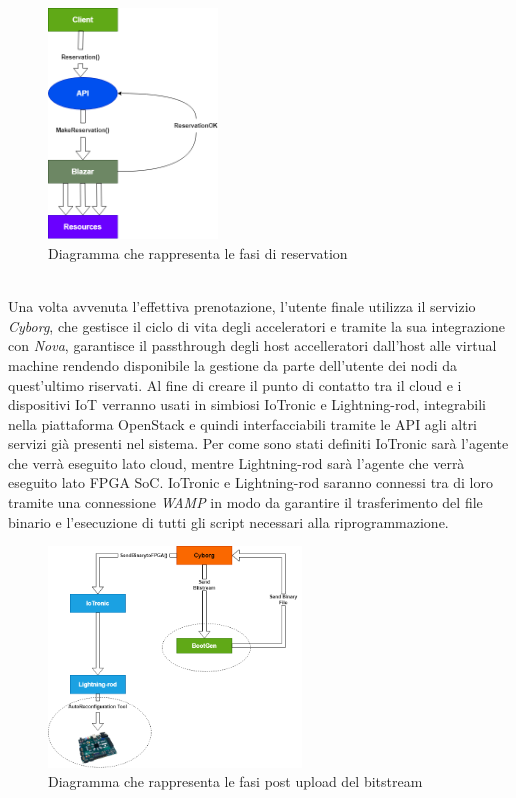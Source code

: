 \begin{figure}[h]
\centering
\includegraphics[width=0.4\textwidth]{images/Arch1.png}
\caption{Diagramma che rappresenta le fasi di reservation}
\end{figure}\\
Una volta avvenuta l'effettiva prenotazione, l'utente finale utilizza il servizio \textit{Cyborg},  che gestisce il ciclo di vita degli acceleratori e tramite la sua integrazione con \textit{Nova}, garantisce il passthrough degli host accelleratori dall'host alle virtual machine rendendo disponibile la gestione da parte dell'utente dei nodi da quest'ultimo riservati. Al fine di creare il punto di contatto tra il cloud e i dispositivi IoT verranno usati in simbiosi IoTronic e Lightning-rod, integrabili nella piattaforma OpenStack e quindi interfacciabili tramite le API agli altri servizi già presenti nel sistema. Per come sono stati definiti IoTronic sarà l'agente che verrà eseguito lato cloud, mentre Lightning-rod sarà l'agente che verrà eseguito lato FPGA SoC. IoTronic e Lightning-rod saranno connessi tra di loro tramite una connessione \textit{WAMP} in modo da garantire il trasferimento del file binario e l'esecuzione di tutti gli script necessari alla riprogrammazione.
\begin{figure}[h]
\centering
\includegraphics[width=0.6\textwidth]{images/Arch.png}
\caption{Diagramma che rappresenta le fasi post upload del bitstream}
\end{figure}\\

